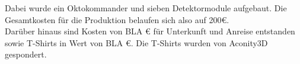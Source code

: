 Dabei wurde ein Oktokommander und sieben Detektormodule aufgebaut. Die Gesamtkosten für die Produktion belaufen sich also auf 200€.\\

Darüber hinaus sind Kosten von BLA \euro{} für Unterkunft und Anreise entstanden sowie T-Shirts in Wert von BLA \euro{}. Die T-Shirts wurden von Aconity3D gespondert.